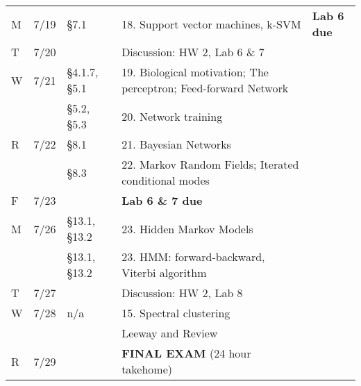 \documentclass[11pt,letter]{article}
\begin{document}
\begin{tabular}{@{}p{}@{}p{}@{}p{}@{}p{}@{}>{\arraybackslash\raggedleft}p{}@{}}
\midrule
M& 7/19& \S7.1 & 18. Support vector machines, k-SVM& \textbf{Lab 6 due}\tabularnewline
T & 7/20 && Discussion: HW 2, Lab 6 \& 7 \tabularnewline
W& 7/21& \S4.1.7, \S5.1 & 19. Biological motivation; The perceptron; Feed-forward Network\tabularnewline
&&  \S5.2, \S5.3 & 20. Network training\tabularnewline
R& 7/22& \S8.1 & 21. Bayesian Networks\tabularnewline
&& \S8.3 & 22. Markov Random Fields; Iterated conditional modes\tabularnewline
F& 7/23 && \textbf{Lab 6 \& 7 due}\\
\midrule
M& 7/26& \S13.1, \S13.2 & 23. Hidden Markov Models\tabularnewline
 && \S13.1, \S13.2 &  23. HMM: forward-backward, Viterbi algorithm \tabularnewline
T & 7/27 && Discussion: HW 2, Lab 8 \tabularnewline
W& 7/28& n/a & 15. Spectral clustering\tabularnewline
 && & Leeway and Review\tabularnewline
R & 7/29& &  \textbf{FINAL EXAM} (24 hour takehome)\tabularnewline
\bottomrule
\end{tabular}
\end{document}
